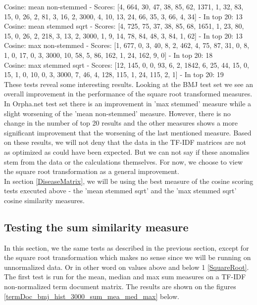 {\small
Cosine: mean non-stemmed - Scores: [4, 664, 30, 47, 38, 85, 62, 1371, 1, 32, 83, 15, 0, 26, 2, 81, 3, 16, 2, 3000, 4, 10, 13, 24, 66, 35, 3, 66, 4, 34] - In top 20: 13 \\
Cosine: mean stemmed sqrt - Scores: [4, 725, 75, 37, 38, 85, 68, 1651, 1, 23, 80, 15, 0, 26, 2, 218, 3, 13, 2, 3000, 1, 9, 14, 78, 84, 48, 3, 84, 1, 62] - In top 20: 13 \\
Cosine: max non-stemmed - Scores: [1, 677, 0, 3, 40, 8, 2, 462, 4, 75, 87, 31, 0, 8, 1, 0, 17, 0, 3, 3000, 10, 58, 5, 86, 162, 1, 24, 162, 9, 0] - In top 20: 18 \\
Cosine: max stemmed sqrt - Scores: [12, 145, 0, 0, 93, 6, 2, 1842, 6, 25, 44, 15, 0, 15, 1, 0, 10, 0, 3, 3000, 7, 46, 4, 128, 115, 1, 24, 115, 2, 1] - In top 20: 19 \\
}
These tests reveal some interesting results. Looking at the BMJ test set we see an overall improvement in the performance of the square root transformed measures. In Orpha.net test set there is an improvement in 'max stemmed' measure while a slight worsening of the 'mean non-stemmed' measure. However, there is no change in the number of top 20 results and the other measures shows a more significant improvement that the worsening of the last mentioned measure. Based on these results, we will not deny that the data in the TF-IDF matrices are not as optimized as could have been expected. But we can not say if these anomalies stem from the data or the calculations themselves. For now, we choose to view the square root transformation as a general improvement. \\

In section \ref{DiseaseMatrix}, we will be using the best measure of the cosine scoring tests executed above - the 'mean stemmed sqrt' and the 'max stemmed sqrt' cosine similarity measures.

\subsection{Testing the sum similarity measure\label{TestingSumSimilarity}}

In this section, we the same tests as described in the previous section, except for the square root transformation which makes no sense since we will be running on unnormalized data. Or in other word on values above and below 1 \ref{SquareRoot}. The first test is run for the mean, median and max sum measures on a TF-IDF non-normalized term document matrix. The results are shown on the figures \ref{termDoc_bmj_hist_3000_sum_mea_med_max} below. 

